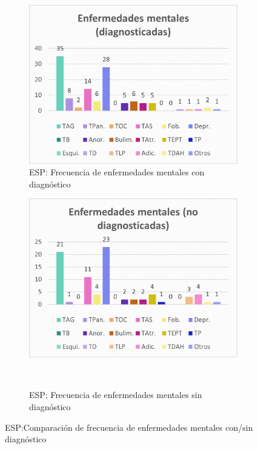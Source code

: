 \documentclass[12pt, a4paper,twoside,titlepage]{book}
\begin{document}
\begin{figure}
\centering
\begin{subfigure}{.5\textwidth}
  \centering
  \includegraphics[width=.95\linewidth]{ANEXO ESP/24AnexESPEnfdiag}
  \caption{ESP: Frecuencia de enfermedades mentales con diagnóstico}
\end{subfigure}%
\begin{subfigure}{.5\textwidth}
  \centering
  \includegraphics[width=.95\linewidth]{ANEXO ESP/25AnexESPEnfnodiag}
  \caption{ESP: Frecuencia de enfermedades mentales sin diagnóstico}  \
\end{subfigure}
\caption{ESP:Comparación de frecuencia de enfermedades mentales con/sin diagnóstico}
\end{figure}
\end{document}
